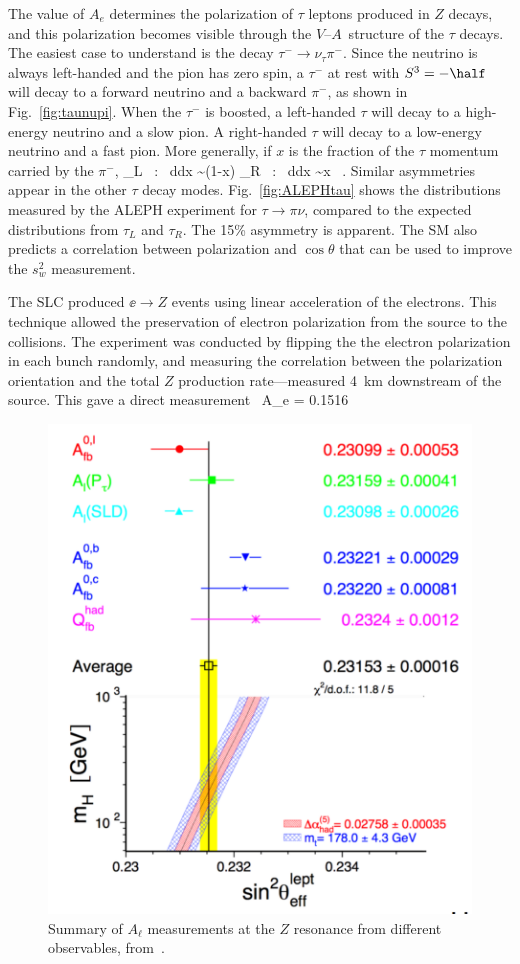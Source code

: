 \documentclass[12pt]{article}
\def\VmA{ $V$--$A$}
\begin{document}
The value of $A_e$ determines the polarization of $\tau$ leptons
produced in $Z$ decays, and this polarization becomes visible through
the \VmA\ structure of the $\tau$ decays.   The easiest case to
understand is the decay $\tau^-\to \nu_\tau \pi^-$.   Since the
neutrino is always left-handed and the pion has zero spin, a $\tau^-$
at rest with $S^3 = - \half$ will decay to a forward neutrino and a
backward $\pi^-$, as shown in Fig.~\ref{fig:taunupi}.   When the
$\tau^-$ is boosted, a left-handed $\tau$ will decay to a high-energy
neutrino and a slow pion.  A right-handed $\tau$ will decay to a
low-energy neutrino and a fast pion.   More generally,  if $x$ is
the fraction of the $\tau$ momentum carried by the $\pi^-$,
\beq
       \tau_L \ : \ {d\Gamma\over dx} \sim (1-x) \qquad \tau_R \ : \
       {d\Gamma\over dx} \sim x \ .
\eeqn
Similar asymmetries appear in the other $\tau$ decay modes.  
 Fig.~\ref{fig:ALEPHtau}
shows the distributions measured by the ALEPH experiment for $\tau\to
\pi \nu$,  compared to the expected
distributions from $\tau_L$ and $\tau_R$.  The 15\% asymmetry is
apparent.   The SM also predicts a correlation
between polarization and $\cos\theta$ that can be used to improve the
$s_w^2$ measurement.

The SLC produced $\ee\to Z$ events using linear acceleration of the
electrons.  This technique allowed the preservation of electron
polarization from the source to the collisions.  The experiment was
conducted by flipping the 
the electron polarization in each bunch randomly, and measuring the
correlation between the polarization orientation and the total $Z$
production rate---measured 4~km downstream of the
source.  This gave a  direct
 measurement~\cite{SLDpol}
\beq
      A_e = 0.1516  
\eeqn

\begin{figure}
\begin{center}
\includegraphics[width=0.60\hsize]{Alsummary.pdf}
\end{center}
\caption{Summary of $A_\ell$ measurements at the $Z$ resonance from
  different observables, from~\cite{LEPEWWG}.}
\label{fig:Aesummary}
\end{figure}
\end{document}
